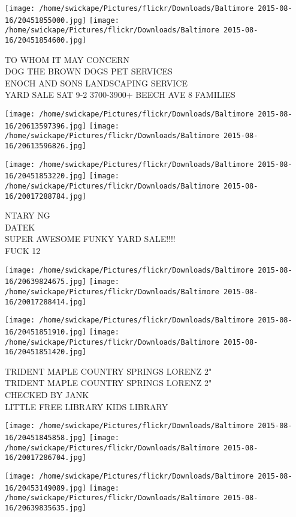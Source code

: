 \documentclass[10pt,letterpaper]{article}
\begin{document}
\texttt{[image: /home/swickape/Pictures/flickr/Downloads/Baltimore 2015-08-16/20451855000.jpg]}
\texttt{[image: /home/swickape/Pictures/flickr/Downloads/Baltimore 2015-08-16/20451854600.jpg]}

TO WHOM IT MAY CONCERN\\
DOG THE BROWN DOGS PET SERVICES\\
ENOCH AND SONS LANDSCAPING SERVICE\\
YARD SALE SAT 9{-}2 3700{-}3900+ BEECH AVE 8 FAMILIES\\
\pagebreak

\texttt{[image: /home/swickape/Pictures/flickr/Downloads/Baltimore 2015-08-16/20613597396.jpg]}
\texttt{[image: /home/swickape/Pictures/flickr/Downloads/Baltimore 2015-08-16/20613596826.jpg]}

\texttt{[image: /home/swickape/Pictures/flickr/Downloads/Baltimore 2015-08-16/20451853220.jpg]}
\texttt{[image: /home/swickape/Pictures/flickr/Downloads/Baltimore 2015-08-16/20017288784.jpg]}

NTARY NG\\
DATEK\\
SUPER AWESOME FUNKY YARD SALE!!!!\\
FUCK 12\\
\pagebreak

\texttt{[image: /home/swickape/Pictures/flickr/Downloads/Baltimore 2015-08-16/20639824675.jpg]}
\texttt{[image: /home/swickape/Pictures/flickr/Downloads/Baltimore 2015-08-16/20017288414.jpg]}

\texttt{[image: /home/swickape/Pictures/flickr/Downloads/Baltimore 2015-08-16/20451851910.jpg]}
\texttt{[image: /home/swickape/Pictures/flickr/Downloads/Baltimore 2015-08-16/20451851420.jpg]}

TRIDENT MAPLE COUNTRY SPRINGS LORENZ 2"\\
TRIDENT MAPLE COUNTRY SPRINGS LORENZ 2"\\
CHECKED BY JANK\\
LITTLE FREE LIBRARY KIDS LIBRARY\\
\pagebreak

\texttt{[image: /home/swickape/Pictures/flickr/Downloads/Baltimore 2015-08-16/20451845858.jpg]}
\texttt{[image: /home/swickape/Pictures/flickr/Downloads/Baltimore 2015-08-16/20017286704.jpg]}

\texttt{[image: /home/swickape/Pictures/flickr/Downloads/Baltimore 2015-08-16/20453149089.jpg]}
\texttt{[image: /home/swickape/Pictures/flickr/Downloads/Baltimore 2015-08-16/20639835635.jpg]}
\end{document}
